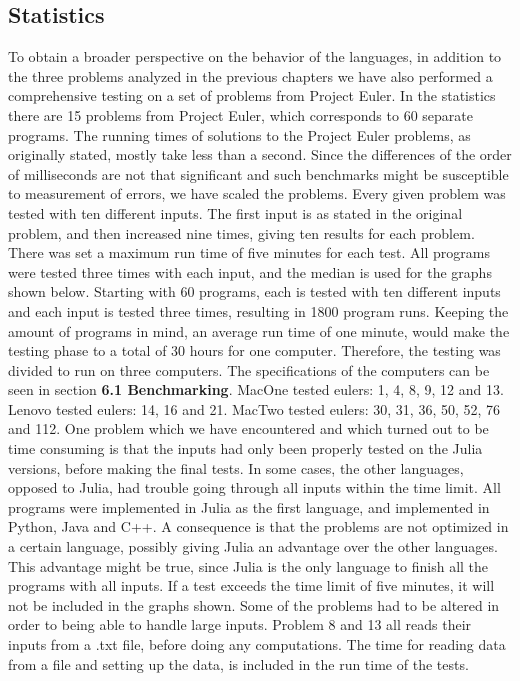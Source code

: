 \documentclass[a4paper, 11pt, titlepage]{article}
\begin{document}
\subsection{Statistics}
To obtain a broader perspective on the behavior of the languages, in addition to the three problems analyzed in the previous chapters we have also performed a comprehensive testing on a set of problems from Project Euler.
In the statistics there are 15 problems from Project Euler, which corresponds to 60 separate programs. The running times of solutions to the Project Euler problems, as originally stated, mostly take less than a second. Since the differences of the order of milliseconds are not that significant and such benchmarks might be susceptible to measurement of errors, we have scaled the problems. Every given problem was tested with ten different inputs. The first input is as stated in the original problem, and then increased nine times, giving ten results for each problem. There was set a maximum run time of five minutes for each test. All programs were tested three times with each input, and the median is used for the graphs shown below. 
Starting with 60 programs, each is tested with ten different inputs and each input is tested three times, resulting in 1800 program runs. Keeping the amount of programs in mind, an average run time of one minute, would make the testing phase to a total of 30 hours for one computer. 
Therefore, the testing was divided to run on three computers. The specifications of the computers can be seen in section \textbf{6.1 Benchmarking}. MacOne tested eulers: 1, 4, 8, 9, 12 and 13. Lenovo tested eulers: 14, 16 and 21. MacTwo tested eulers: 30, 31, 36, 50, 52, 76 and 112.
One problem which we have encountered and which turned out to be time consuming is that the inputs had only been properly tested on the Julia versions, before making the final tests. In some cases, the other languages, opposed to Julia, had trouble going through all inputs within the time limit. All programs were implemented in Julia as the first language, and implemented in Python, Java and C++. A consequence is that the problems are not optimized in a certain language, possibly giving Julia an advantage over the other languages. This advantage might be true, since Julia is the only language to finish all the programs with all inputs.
If a test exceeds the time limit of five minutes, it will not be included in the graphs shown.
Some of the problems had to be altered in order to being able to handle large inputs. Problem 8 and 13 all reads their inputs from a .txt file, before doing any computations. The time for reading data from a file and setting up the data, is 
included in the run time of the tests.
\end{document}
